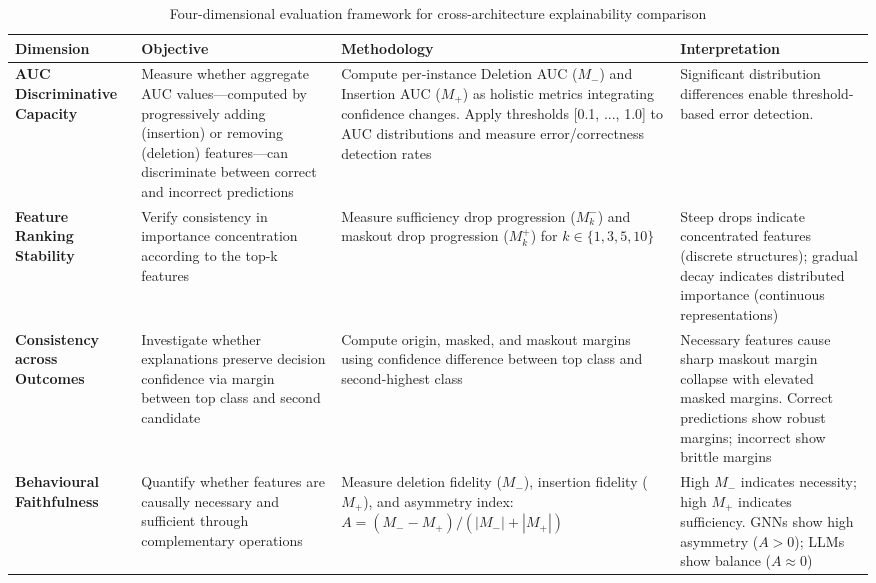 \documentclass[preprint, times, review, 10pt]{elsarticle}
\begin{document}
\begin{table}[H]
\centering
\scriptsize
\setlength{\tabcolsep}{4pt}
\renewcommand{\arraystretch}{1.1}
\caption{Four-dimensional evaluation framework for cross-architecture explainability comparison}
\label{tab:evaluation_dimensions}
\begin{tabular}{@{}p{}p{}p{}p{}@{}}
\toprule
\textbf{Dimension} & \textbf{Objective} & \textbf{Methodology} & \textbf{Interpretation} \\
\midrule

\textbf{AUC Discriminative Capacity} 
& Measure whether aggregate AUC values—computed by progressively adding (insertion) or removing (deletion) features—can discriminate between correct and incorrect predictions
& Compute per-instance Deletion AUC (\(M_-\)) and Insertion AUC (\(M_+\)) as holistic metrics integrating confidence changes. Apply thresholds [0.1, ..., 1.0] to AUC distributions and measure error/correctness detection rates
& Significant distribution differences enable threshold-based error detection.
\\
\midrule

\textbf{Feature Ranking Stability} 
& Verify consistency in importance concentration according to the top-k features
& Measure sufficiency drop progression (\(M_k^-\)) and maskout drop progression (\(M_k^+\)) for \(k \in \{1,3,5,10\}\) 
& Steep drops indicate concentrated features (discrete structures); gradual decay indicates distributed importance (continuous representations)
\\
\midrule

\textbf{Consistency across Outcomes} 
& Investigate whether explanations preserve decision confidence via margin between top class and second candidate
& Compute origin, masked, and maskout margins using confidence difference between top class and second-highest class 
& Necessary features cause sharp maskout margin collapse with elevated masked margins. Correct predictions show robust margins; incorrect show brittle margins
\\
\midrule

\textbf{Behavioural Faithfulness} 
& Quantify whether features are causally necessary and sufficient through complementary operations
& Measure deletion fidelity (\(M_-\)), insertion fidelity (\(M_+\)), and asymmetry index: \(A = (M_- - M_+)/(|M_-| + |M_+|)\) 
& High \(M_-\) indicates necessity; high \(M_+\) indicates sufficiency. GNNs show high asymmetry (\(A > 0\)); LLMs show balance (\(A \approx 0\))
\\
\bottomrule
\end{tabular}
\end{table}
\end{document}
